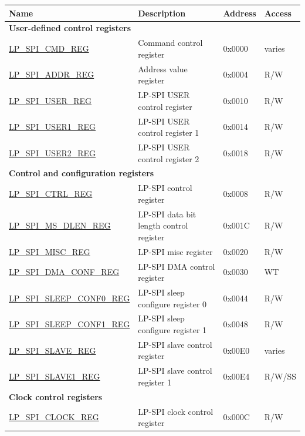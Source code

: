 \begin{longtable}{ | p{6cm} | p{7.2cm} | p{1.3cm} | p{1cm} | }
\hline\rowcolor{lightgray}
\textbf{Name} & \textbf{Description} &  \textbf{Address} & \textbf{Access} \\ \hline
\endhead
\multicolumn{4}{|l|}{\textbf{User-defined control registers}} \\ \hline
\hyperref[regdesc:LPSPICMDREG]{LP\_SPI\_CMD\_REG} & Command control register & 0x0000 & varies \\ \hline
\hyperref[regdesc:LPSPIADDRREG]{LP\_SPI\_ADDR\_REG} & Address value register & 0x0004 & R/W \\ \hline
\hyperref[regdesc:LPSPIUSERREG]{LP\_SPI\_USER\_REG} & LP-SPI USER control register & 0x0010 & R/W \\ \hline
\hyperref[regdesc:LPSPIUSER1REG]{LP\_SPI\_USER1\_REG} & LP-SPI USER control register 1 & 0x0014 & R/W \\ \hline
\hyperref[regdesc:LPSPIUSER2REG]{LP\_SPI\_USER2\_REG} & LP-SPI USER control register 2 & 0x0018 & R/W \\ \hline
\multicolumn{4}{|l|}{\textbf{Control and configuration registers}} \\ \hline
\hyperref[regdesc:LPSPICTRLREG]{LP\_SPI\_CTRL\_REG} & LP-SPI control register & 0x0008 & R/W \\ \hline
\hyperref[regdesc:LPSPIMSDLENREG]{LP\_SPI\_MS\_DLEN\_REG} & LP-SPI data bit length control register & 0x001C & R/W \\ \hline
\hyperref[regdesc:LPSPIMISCREG]{LP\_SPI\_MISC\_REG} & LP-SPI misc register & 0x0020 & R/W \\ \hline
\hyperref[regdesc:LPSPIDMACONFREG]{LP\_SPI\_DMA\_CONF\_REG} & LP-SPI DMA control register & 0x0030 & WT \\ \hline
\hyperref[regdesc:LPSPISLEEPCONF0REG]{LP\_SPI\_SLEEP\_CONF0\_REG} & LP-SPI sleep configure register 0 & 0x0044 & R/W \\ \hline
\hyperref[regdesc:LPSPISLEEPCONF1REG]{LP\_SPI\_SLEEP\_CONF1\_REG} & LP-SPI sleep configure register 1 & 0x0048 & R/W \\ \hline
\hyperref[regdesc:LPSPISLAVEREG]{LP\_SPI\_SLAVE\_REG} & LP-SPI slave control register & 0x00E0 & varies \\ \hline
\hyperref[regdesc:LPSPISLAVE1REG]{LP\_SPI\_SLAVE1\_REG} & LP-SPI slave control register 1 & 0x00E4 & R/W/SS \\ \hline
\multicolumn{4}{|l|}{\textbf{Clock control registers}} \\ \hline
\hyperref[regdesc:LPSPICLOCKREG]{LP\_SPI\_CLOCK\_REG} & LP-SPI clock control register & 0x000C & R/W \\ \hline

\end{longtable}
